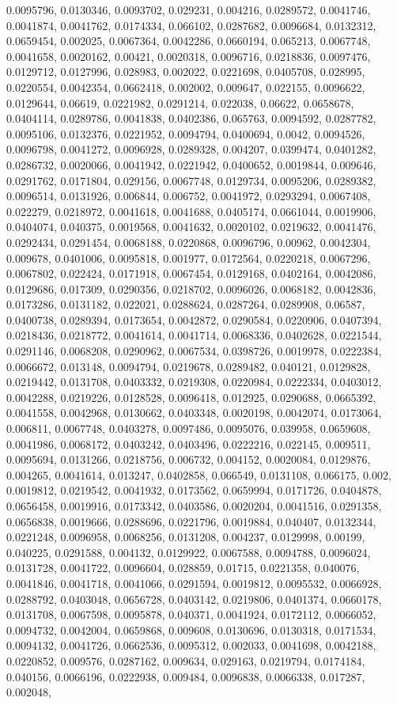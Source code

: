 0.0095796, 0.0130346, 0.0093702, 0.029231, 0.004216, 0.0289572, 0.0041746, 0.0041874, 0.0041762, 0.0174334, 0.066102, 0.0287682, 0.0096684, 0.0132312, 0.0659454, 0.002025, 0.0067364, 0.0042286, 0.0660194, 0.065213, 0.0067748, 0.0041658, 0.0020162, 0.00421, 0.0020318, 0.0096716, 0.0218836, 0.0097476, 0.0129712, 0.0127996, 0.028983, 0.002022, 0.0221698, 0.0405708, 0.028995, 0.0220554, 0.0042354, 0.0662418, 0.002002, 0.009647, 0.022155, 0.0096622, 0.0129644, 0.06619, 0.0221982, 0.0291214, 0.022038, 0.06622, 0.0658678, 0.0404114, 0.0289786, 0.0041838, 0.0402386, 0.065763, 0.0094592, 0.0287782, 0.0095106, 0.0132376, 0.0221952, 0.0094794, 0.0400694, 0.0042, 0.0094526, 0.0096798, 0.0041272, 0.0096928, 0.0289328, 0.004207, 0.0399474, 0.0401282, 0.0286732, 0.0020066, 0.0041942, 0.0221942, 0.0400652, 0.0019844, 0.009646, 0.0291762, 0.0171804, 0.029156, 0.0067748, 0.0129734, 0.0095206, 0.0289382, 0.0096514, 0.0131926, 0.006844, 0.006752, 0.0041972, 0.0293294, 0.0067408, 0.022279, 0.0218972, 0.0041618, 0.0041688, 0.0405174, 0.0661044, 0.0019906, 0.0404074, 0.040375, 0.0019568, 0.0041632, 0.0020102, 0.0219632, 0.0041476, 0.0292434, 0.0291454, 0.0068188, 0.0220868, 0.0096796, 0.00962, 0.0042304, 0.009678, 0.0401006, 0.0095818, 0.001977, 0.0172564, 0.0220218, 0.0067296, 0.0067802, 0.022424, 0.0171918, 0.0067454, 0.0129168, 0.0402164, 0.0042086, 0.0129686, 0.017309, 0.0290356, 0.0218702, 0.0096026, 0.0068182, 0.0042836, 0.0173286, 0.0131182, 0.022021, 0.0288624, 0.0287264, 0.0289908, 0.06587, 0.0400738, 0.0289394, 0.0173654, 0.0042872, 0.0290584, 0.0220906, 0.0407394, 0.0218436, 0.0218772, 0.0041614, 0.0041714, 0.0068336, 0.0402628, 0.0221544, 0.0291146, 0.0068208, 0.0290962, 0.0067534, 0.0398726, 0.0019978, 0.0222384, 0.0066672, 0.013148, 0.0094794, 0.0219678, 0.0289482, 0.040121, 0.0129828, 0.0219442, 0.0131708, 0.0403332, 0.0219308, 0.0220984, 0.0222334, 0.0403012, 0.0042288, 0.0219226, 0.0128528, 0.0096418, 0.012925, 0.0290688, 0.0665392, 0.0041558, 0.0042968, 0.0130662, 0.0403348, 0.0020198, 0.0042074, 0.0173064, 0.006811, 0.0067748, 0.0403278, 0.0097486, 0.0095076, 0.039958, 0.0659608, 0.0041986, 0.0068172, 0.0403242, 0.0403496, 0.0222216, 0.022145, 0.009511, 0.0095694, 0.0131266, 0.0218756, 0.006732, 0.004152, 0.0020084, 0.0129876, 0.004265, 0.0041614, 0.013247, 0.0402858, 0.066549, 0.0131108, 0.066175, 0.002, 0.0019812, 0.0219542, 0.0041932, 0.0173562, 0.0659994, 0.0171726, 0.0404878, 0.0656458, 0.0019916, 0.0173342, 0.0403586, 0.0020204, 0.0041516, 0.0291358, 0.0656838, 0.0019666, 0.0288696, 0.0221796, 0.0019884, 0.040407, 0.0132344, 0.0221248, 0.0096958, 0.0068256, 0.0131208, 0.004237, 0.0129998, 0.00199, 0.040225, 0.0291588, 0.004132, 0.0129922, 0.0067588, 0.0094788, 0.0096024, 0.0131728, 0.0041722, 0.0096604, 0.028859, 0.01715, 0.0221358, 0.040076, 0.0041846, 0.0041718, 0.0041066, 0.0291594, 0.0019812, 0.0095532, 0.0066928, 0.0288792, 0.0403048, 0.0656728, 0.0403142, 0.0219806, 0.0401374, 0.0660178, 0.0131708, 0.0067598, 0.0095878, 0.040371, 0.0041924, 0.0172112, 0.0066052, 0.0094732, 0.0042004, 0.0659868, 0.009608, 0.0130696, 0.0130318, 0.0171534, 0.0094132, 0.0041726, 0.0662536, 0.0095312, 0.002033, 0.0041698, 0.0042188, 0.0220852, 0.009576, 0.0287162, 0.009634, 0.029163, 0.0219794, 0.0174184, 0.040156, 0.0066196, 0.0222938, 0.009484, 0.0096838, 0.0066338, 0.017287, 0.002048, 